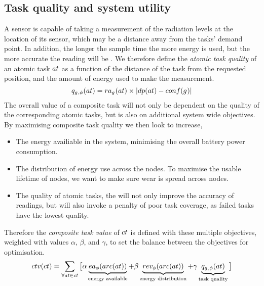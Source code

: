 \newcommand{\functionAtomicTaskQualitySignature}[2]{
	\functionSignature{q_{\varAgent{}{}, \varTime{}{}}} {\varAtomicTask{}{}}
}
\newcommand{\functionCompositeTaskValue}[2]{
	\functionSignature{ctv}{\varCompositeTask{}{}}
}

\newcommand{\functionSystemUtility}[2]{\functionSignature{u_{\setTime{}{}}}{\setCompositeTask{}{}}}
\subsection{Task quality and system utility}

A sensor is capable of taking a measurement of the radiation levels at the location of its sensor, which may be a distance away from the tasks' demand point. In addition, the longer the sample time the more energy is used, but the more accurate the reading will be \cite{dummy}. We therefore define the \textit{atomic task quality} of an atomic task $\varAtomicTask{}{}$ as a function of the distance of the task from the requested position, and the amount of energy used to make the measurement.
	\begin{equation}
		\functionAtomicTaskQualitySignature{}{} = \functionTaskResourceAllocation{}{} \times \funcSize{
				\functionTaskDemandPoint{}{} - \functionDeployment{\varAgent{}{}}{}
		}{}
	\end{equation}
The overall value of a composite task will not only be dependent on the quality of the corresponding atomic tasks, but is also on additional system wide objectives.
By maximising composite task quality we then look to increase,
\begin{itemize}
	\item The energy availiable in the system, minimising the overall battery power consumption.
	\item The distribution of energy use across the nodes. To maximise the usable lifetime of nodes, we want to make sure wear is spread across nodes. 
	\item The quality of atomic tasks, the will not only improve the accuracy of readings, but will also invoke a penalty of poor task coverage, as failed tasks have the lowest quality.
\end{itemize}
 Therefore the \textit{composite task value} of $\varCompositeTask{}{}$ is defined with these multiple objectives, weighted with values $\alpha$, $\beta$, and $\gamma$, to set the balance between the objectives for optimisation.
	\begin{equation}
		\functionCompositeTaskValue{}{} = 
		\sum_{\forall \varAtomicTask{}{} \in \varCompositeTask{}{}}
		\big\lbrack
		\alpha\underbrace{\functionEnergyAvailable{\functionTaskArc{}{}}{}}_{\text{energy available}}
		+ \beta\underbrace{\functionEnergyVariability{\functionTaskArc{}{}}{}}_{\text{energy distribution}}
		+ 
		\gamma\underbrace{\functionAtomicTaskQualitySignature{}{}}_{\text{task quality}}
		\big\rbrack
	\end{equation}
